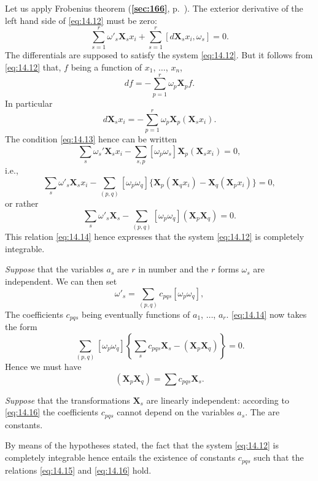 \documentclass[leqno,11pt]{book}
\numberwithin{equation}{chapter}
\theoremstyle{shape1}
\theoremstyle{shapesmall}
\newcommand{\fsref}[1]{{\rm\textsection\textbf{\ref{sec:#1}}}}
\begin{document}
Let us apply Frobenius theorem (\fsref{166}, p.~\pageref{sec:166}). The exterior derivative of the left hand side of \eqref{eq:14.12} must be zero:
\begin{equation}
  \label{eq:14.13}
  \sum_{s=1}^{r}\omega'_{s}\mathbf{X}_{s}x_{i}+\sum_{s=1}^{r}[d\mathbf{X}_{s}x_{i},\omega_{s}]=0.
\end{equation}
The differentials are supposed to satisfy the system \eqref{eq:14.12}. But it follows from \eqref{eq:14.12} that, $f$ being a function of $x_{1}$, $\dots$, $x_{n}$,
\[
df=-\sum_{p=1}^{r}\omega_{p}\mathbf{X}_{p}f.
\]
In particular
\[
d\mathbf{X}_{s}x_{i}=-\sum_{p=1}^{r}\omega_{p}\mathbf{X}_{p}(\mathbf{X}_{s}x_{i}).
\]
The condition \eqref{eq:14.13} hence can be written
\[
\sum_{s}\omega_{s}'\mathbf{X}_{s}x_{i}-\sum_{s,p}[\omega_{p}\omega_{s}]\mathbf{X}_{p}(\mathbf{X}_{s}x_{i})=0,
\]
i.e.,
\[
\sum_{s}\omega'_{s}\mathbf{X}_{s}x_{i}-\sum_{(p,q)}[\omega_{p}\omega_{q}]\{\mathbf{X}_{p}(\mathbf{X}_{q}x_{i})-\mathbf{X}_{q}(\mathbf{X}_{p}x_{i})\}=0,
\]
or rather
\begin{equation}
  \label{eq:14.14}
  \sum_{s}\omega'_{s}\mathbf{X}_{s}-\sum_{(p,q)}[\omega_{p}\omega_{q}](\mathbf{X}_{p}\mathbf{X}_{q})=0.
\end{equation}
This relation \eqref{eq:14.14} hence expresses that the system \eqref{eq:14.12} is completely integrable.

\emph{Suppose} that the variables $a_{s}$ are $r$ in number and the $r$ forms $\omega_{s}$ are independent. We can then set
\begin{equation}
  \label{eq:14.15}
  \omega'_{s}=\sum_{(p,q)}c_{pqs}[\omega_{p}\omega_{q}],
\end{equation}
The coefficients $c_{pqs}$ being eventually functions of $a_{1}$, $\dots$, $a_{r}$. \eqref{eq:14.14} now takes the form
\[
\sum_{(p,q)}[\omega_{p}\omega_{q}]\left\{\sum_{s}c_{pqs}\mathbf{X}_{s}-(\mathbf{X}_{p}\mathbf{X}_{q})\right\}=0.
\]
Hence we must have
\begin{equation}
  \label{eq:14.16}
  (\mathbf{X}_{p}\mathbf{X}_{q})=\sum c_{pqs}\mathbf{X}_{s}.
\end{equation}

\emph{Suppose} that the transformations $\mathbf{X}_{s}$ are linearly independent: according to \eqref{eq:14.16} the coefficients $c_{pqs}$ cannot depend on the variables $a_{s}$. The are constants.

By means of the hypotheses stated, the fact that the system \eqref{eq:14.12} is completely integrable hence entails the existence of constants $c_{pqs}$ such that the relations \eqref{eq:14.15} and \eqref{eq:14.16} hold.
\end{document}

